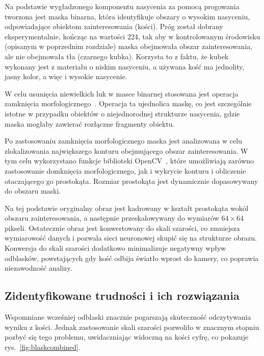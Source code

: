 Na podstawie wygładzonego komponentu nasycenia za pomocą progowania tworzona jest maska binarna,
która identyfikuje obszary o wysokim nasyceniu, odpowiadające obiektom zainteresowania (kości).
Próg został dobrany eksperymentalnie, kończąc na wartości 224,
tak aby w kontrolowanym środowisku (opisanym w poprzednim rozdziale) maska obejmowała obszar zainteresowania,
ale nie obejmowała tła (czarnego kubka).
Korzysta to z faktu, że kubek wykonany jest z materiału o niskim nasyceniu,
a używana kość ma jednolity, jasny kolor, a więc i wysokie nasycenie.

W celu usunięcia niewielkich luk w masce binarnej stosowana jest operacja zamknięcia morfologicznego~\cite{morphological_closure}.
Operacja ta ujednolica maskę, co jest szczególnie istotne w przypadku obiektów o niejednorodnej strukturze nasycenia,
gdzie maska mogłaby zawierać rozłączne fragmenty obiektu.

Po zastosowaniu zamknięcia morfologicznego maska jest analizowana w celu
zlokalizowania największego konturu obejmującego obszar zainteresowania.
W tym celu wykorzystano funkcje biblioteki OpenCV~\cite{opencv_docs},
które umożliwiają zarówno zastosowanie domknięcia morfologicznego, jak i wykrycie konturu i obliczenie otaczającego go prostokąta.
Rozmiar prostokąta jest dynamicznie dopasowywany do obszaru maski.

Na tej podstawie oryginalny obraz jest kadrowany w kształt prostokąta wokół obszaru zainteresowania,
a następnie przeskalowywany do wymiarów $64 \times 64$ pikseli.
Ostatecznie obraz jest konwertowany do skali szarości, co zmniejsza wymiarowość danych
i pozwala sieci neuronowej skupić się na strukturze obrazu.
Konwersja do skali szarości dodatkowo minimalizuje negatywny wpływ odblasków,
powstających gdy kość odbija światło wprost do kamery, co poprawia niezawodność analizy.


\subsection{Zidentyfikowane trudności i ich rozwiązania}\label{subsec:zidentyfikowane-trudnosci-i-ich-rozwiazania}

Wspomniane wcześniej odblaski znacznie pogarszają skuteczność odczytywania wyniku z kości.
Jednak zastosowanie skali szarości pozwoliło w znacznym stopniu pozbyć się tego problemu,
uwidaczniając widoczną na kości cyfrę, co pokazuje rys.~\ref{fig:blaskcombined}.

